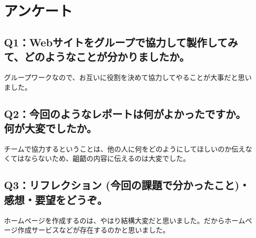 \documentclass[12pt,a4j]{jarticle}
\begin{document}
\section{アンケート}

\subsection{Q1：Webサイトをグループで協力して製作してみて、どのようなことが分かりましたか。}
グループワークなので、お互いに役割を決めて協力してやることが大事だと思いました。

\subsection{Q2：今回のようなレポートは何がよかったですか。何が大変でしたか。}
チームで協力するということは、他の人に何をどのようにしてほしいのか伝えなくてはならないため、齟齬の内容に伝えるのは大変でした。

\subsection{Q3：リフレクション (今回の課題で分かったこと)・感想・要望をどうぞ。}
ホームページを作成するのは、やはり結構大変だと思いました。だからホームページ作成サービスなどが存在するのかと思いました。
\end{document}
